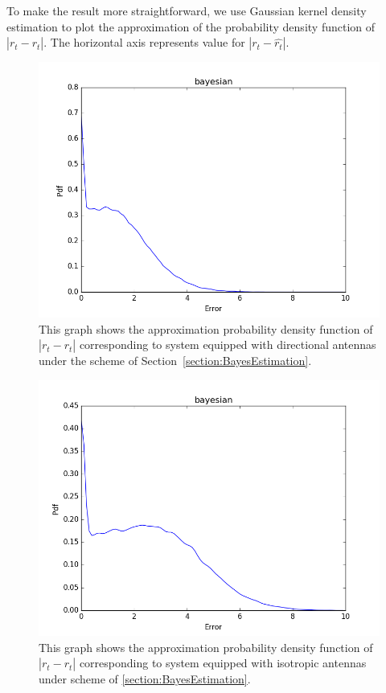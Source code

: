 To make the result more straightforward, we use Gaussian kernel density estimation to plot the approximation of the probability density function of $|r_{t}-\hat{r_{t}}|$.
The horizontal axis represents value for $|r_{t}-\hat{r_{t}}|$.
\begin{figure}[]
	\centering
	\includegraphics[scale=0.5]{Figures/bayesrtdir.png}
	\caption{This graph shows the approximation probability density function of $|r_{t}-\hat{r_{t}}|$ corresponding to system equipped with directional antennas under the scheme of Section~\ref{section:BayesEstimation}. }
	\label{figure: BayesRtdir}
\end{figure}
\begin{figure}[]
	\centering
	\includegraphics[scale=0.5]{Figures/bayesrtomni.png}
	\caption{This graph shows the approximation probability density function of $|r_{t}-\hat{r_{t}}|$ corresponding to system equipped with isotropic antennas under scheme of \ref{section:BayesEstimation}. }
	\label{figure: BayesRtomni}
\end{figure}
